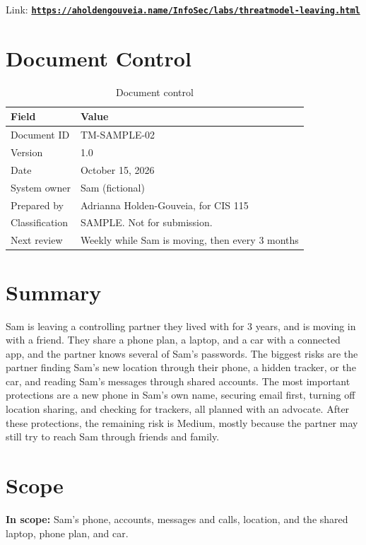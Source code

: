 \documentclass[11pt]{article}
\begin{document}
Link: \href{https://aholdengouveia.name/InfoSec/labs/threatmodel-leaving.html}{\textbf{\nolinkurl{https://aholdengouveia.name/InfoSec/labs/threatmodel-leaving.html}}}

\section{Document Control}
\begin{table}[H]
\caption{Document control}
\begin{tabular}{|m{}|m{}|}
\hline
\textbf{Field} & \textbf{Value} \\
\hline
Document ID & TM-SAMPLE-02 \\
\hline
Version & 1.0 \\
\hline
Date & October 15, 2026 \\
\hline
System owner & Sam (fictional) \\
\hline
Prepared by & Adrianna Holden-Gouveia, for CIS 115 \\
\hline
Classification & SAMPLE. Not for submission. \\
\hline
Next review & Weekly while Sam is moving, then every 3 months
\end{tabular}
\end{table}

\section{Summary}
Sam is leaving a controlling partner they lived with for 3 years, and is moving in with a friend. They share a phone plan, a laptop, and a car with a connected app, and the partner knows several of Sam's passwords. The biggest risks are the partner finding Sam's new location through their phone, a hidden tracker, or the car, and reading Sam's messages through shared accounts. The most important protections are a new phone in Sam's own name, securing email first, turning off location sharing, and checking for trackers, all planned with an advocate. After these protections, the remaining risk is Medium, mostly because the partner may still try to reach Sam through friends and family.

\section{Scope}
\textbf{In scope:} Sam's phone, accounts, messages and calls, location, and the shared laptop, phone plan, and car.
\end{document}
